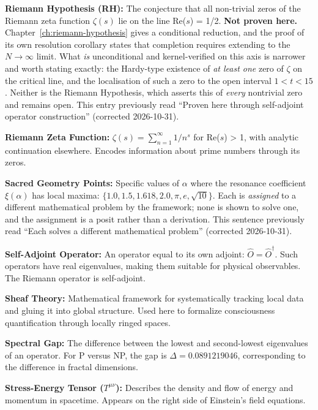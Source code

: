 \noindent\textbf{Riemann Hypothesis (RH):} The conjecture that all non-trivial zeros of the Riemann zeta function $\zeta(s)$ lie on the line Re($s$) = 1/2. \textbf{Not proven here.}
Chapter~\ref{ch:riemann-hypothesis} gives a conditional reduction, and the proof
of its own resolution corollary states that completion requires extending to the
$N \to \infty$ limit. What \emph{is} unconditional and kernel-verified on this
axis is narrower and worth stating exactly: the Hardy-type existence of
\emph{at least one} zero of $\zeta$ on the critical line, and the localisation
of such a zero to the open interval $1 < t < 15$. Neither is the Riemann
Hypothesis, which asserts this of \emph{every} nontrivial zero and remains open.
This entry previously read ``Proven here through self-adjoint operator
construction'' (corrected 2026-10-31).

\noindent\textbf{Riemann Zeta Function:} $\zeta(s) = \sum_{n=1}^{\infty} 1/n^s$ for Re($s$) > 1, with analytic continuation elsewhere. Encodes information about prime numbers through its zeros.

\noindent\textbf{Sacred Geometry Points:} Specific values of $\alpha$ where the resonance coefficient $\xi(\alpha)$ has local maxima: $\{1.0, 1.5, 1.618, 2.0, \pi, e, \sqrt{10}\}$. Each is
\emph{assigned} to a different mathematical problem by the framework; none is
shown to solve one, and the assignment is a posit rather than a derivation. This
sentence previously read ``Each solves a different mathematical problem''
(corrected 2026-10-31).

\noindent\textbf{Self-Adjoint Operator:} An operator equal to its own adjoint: $\hat{O} = \hat{O}^\dagger$. Such operators have real eigenvalues, making them suitable for physical observables. The Riemann operator is self-adjoint.

\noindent\textbf{Sheaf Theory:} Mathematical framework for systematically tracking local data and gluing it into global structure. Used here to formalize consciousness quantification through locally ringed spaces.

\noindent\textbf{Spectral Gap:} The difference between the lowest and second-lowest eigenvalues of an operator. For P versus NP, the gap is $\Delta = 0.0891219046$, corresponding to the difference in fractal dimensions.

\noindent\textbf{Stress-Energy Tensor ($T^{\mu\nu}$):} Describes the density and flow of energy and momentum in spacetime. Appears on the right side of Einstein's field equations.

